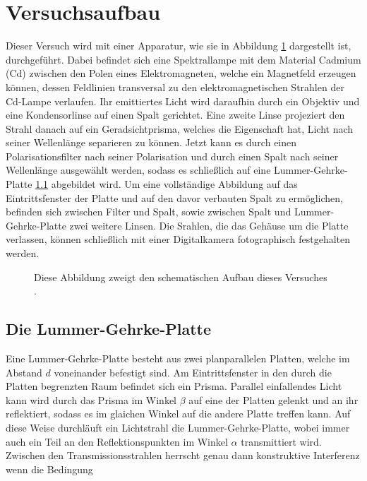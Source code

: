 \section{Versuchsaufbau}
\label{sec:Versuchsaufbau}

Dieser Versuch wird mit einer Apparatur, wie sie in 
Abbildung \ref{abb1} dargestellt ist, durchgeführt.
Dabei befindet sich eine Spektrallampe mit dem Material 
Cadmium (Cd) zwischen den Polen eines Elektromagneten, 
welche ein Magnetfeld erzeugen können, dessen Feldlinien 
transversal zu den elektromagnetischen Strahlen der 
Cd-Lampe verlaufen.
Ihr emittiertes Licht wird daraufhin durch ein Objektiv und 
eine Kondensorlinse auf einen Spalt gerichtet. Eine zweite 
Linse projeziert den Strahl danach auf ein Geradsichtprisma, 
welches die Eigenschaft hat, Licht nach seiner 
Wellenlänge separieren zu können. Jetzt kann es durch einen 
Polarisationsfilter nach seiner Polarisation und durch einen 
Spalt nach seiner Wellenlänge ausgewählt werden, sodass es 
schließlich auf eine Lummer-Gehrke-Platte \ref{LGP} abgebildet 
wird. Um eine vollständige Abbildung auf das Eintrittsfenster
der Platte und auf den davor verbauten Spalt zu ermöglichen, 
befinden sich zwischen Filter und Spalt, sowie zwischen 
Spalt und Lummer-Gehrke-Platte zwei weitere Linsen. 
Die Srahlen, die das Gehäuse um die Platte verlassen,
können schließlich mit einer Digitalkamera fotographisch 
festgehalten werden.

\begin{figure}
    \centering
    \caption{Diese Abbildung zweigt den schematischen Aufbau dieses Versuches \cite{sample}.}
    \label{abb1}
\end{figure}

\subsection{Die Lummer-Gehrke-Platte}
\label{LGP}

Eine Lummer-Gehrke-Platte besteht aus zwei planparallelen 
Platten, welche im Abstand $d$ voneinander befestigt sind.
Am Eintrittsfenster in den durch die Platten begrenzten Raum 
befindet sich ein Prisma. Parallel einfallendes Licht kann 
wird durch das Prisma im Winkel $\beta$ auf eine der Platten 
gelenkt und an ihr reflektiert, sodass es im glaichen Winkel 
auf die andere Platte treffen kann. Auf diese Weise durchläuft 
ein Lichtstrahl die Lummer-Gehrke-Platte, wobei immer auch
ein Teil an den Reflektionspunkten im Winkel $\alpha$ transmittiert wird. 
Zwischen den Transmissionsstrahlen herrscht genau dann 
konstruktive Interferenz wenn die Bedingung

